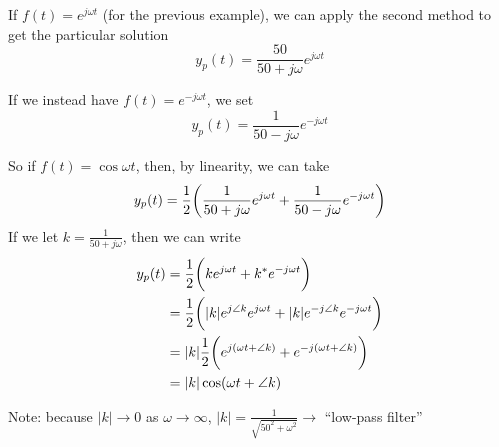 \documentclass[12pt]{article}
\begin{document}
\begin{example}
If $f(t) = e^{j\omega t}$ (for the previous example), we can apply the second method to get the particular solution \[ y_p(t) = \frac{50}{50 + j\omega} e^{j\omega t} \]

If we instead have $f(t) = e^{-j\omega t}$, we set \[ y_p(t) = \frac{1}{50-j\omega}e^{-j\omega t} \]

So if $f(t) = \cos\omega t$, then, by linearity, we can take \[ y_p(t) = \frac{1}{2} \bigg(\frac{1}{50+j\omega}e^{j\omega t} + \frac{1}{50-j\omega} e^{-j\omega t}\bigg) \] If we let $k = \frac{1}{50 + j\omega}$, then we can write
\begin{align*}
y_p(t) &= \frac{1}{2} \bigg(ke^{j\omega t} + k^* e^{-j\omega t}\bigg)\\
&= \frac{1}{2} \bigg( |k|e^{j\angle k}e^{j\omega t} + |k|e^{-j\angle k}e^{-j\omega t}\bigg)\\
&= |k|\frac{1}{2} \bigg(e^{j(\omega t+ \angle k)} + e^{-j(\omega t + \angle k)}\bigg)\\
&= |k| \cos(\omega t + \angle k)
\end{align*}

Note: because $|k| \to 0$ as $\omega \to \infty$, $|k| = \frac{1}{\sqrt{50^2 + \omega^2}} \to $ ``low-pass filter''
\end{example}
\end{document}
